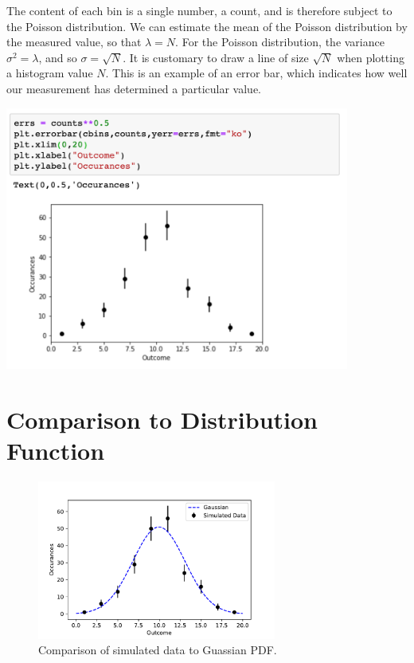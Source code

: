 The content of each bin is a single number, a count, and is therefore
subject to the Poisson distribution.  We can estimate the mean of the
Poisson distribution by the measured value, so that $\lambda = N$.
For the Poisson distribution, the variance $\sigma^2 = \lambda$, and
so $\sigma = \sqrt{N}$.  It is customary to draw a line of size
$\sqrt{N}$ when plotting a histogram value $N$. This is an example of
an error bar, which indicates how well our measurement has determined
a particular value.
\begin{center}
\includegraphics[width=0.85\textwidth]{figs/histograms/err.png}\\ 
\end{center}

\section{Comparison to Distribution Function}

\begin{figure}[htbp]
\begin{center}
\includegraphics[width=0.7\textwidth]{figs/histograms/gaussian_eg.pdf} 
\end{center}
\caption{\label{fig:gauss} Comparison of simulated data to Guassian PDF.}
\end{figure}

